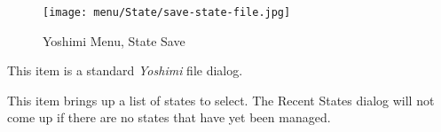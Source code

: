 \begin{figure}[H]
   \centering 
   \texttt{[image: menu/State/save-state-file.jpg]}
   \caption{Yoshimi Menu, State Save}
   \label{fig:yoshimi_menu_state_save}
\end{figure}

   This item is a standard \textsl{Yoshimi} file dialog.

   This item brings up a list of states to select.
   The Recent States dialog will not come up if there are no states that have
   yet been managed.

